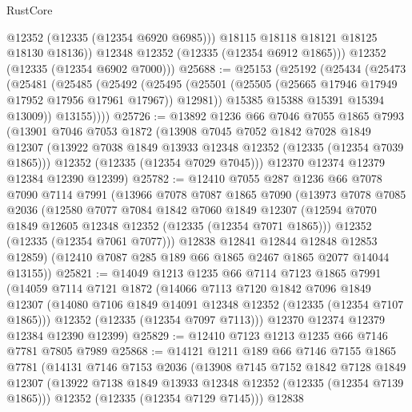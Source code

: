 \begin{lexlean}{RustCore}
\begin{coremodule}
              @12352
              (@12335 (@12354 @6920 @6985)))
            @18115
            @18118
            @18121
            @18125
            @18130
            @18136))
        @12348
        @12352
        (@12335 (@12354 @6912 @1865)))
      @12352
      (@12335 (@12354 @6902 @7000)))
@25688 := @25153
    (@25192
      (@25434
        (@25473
          (@25481
            (@25485
              (@25492
                (@25495 (@25501 (@25505 (@25665 @17946 @17949 @17952 @17956 @17961 @17967)) @12981))
                @15385
                @15388
                @15391
                @15394
                @13009))
            @13155))))
@25726 := @13892
    @1236
    @66
    @7046
    @7055
    @1865
    @7993
    (@13901
      @7046
      @7053
      @1872
      (@13908
        @7045
        @7052
        @1842
        @7028
        @1849
        @12307
        (@13922 @7038 @1849 @13933 @12348 @12352 (@12335 (@12354 @7039 @1865)))
        @12352
        (@12335 (@12354 @7029 @7045)))
      @12370
      @12374
      @12379
      @12384
      @12390
      @12399)
@25782 := @12410
    @7055
    @287
    @1236
    @66
    @7078
    @7090
    @7114
    @7991
    (@13966
      @7078
      @7087
      @1865
      @7090
      (@13973
        @7078
        @7085
        @2036
        (@12580
          @7077
          @7084
          @1842
          @7060
          @1849
          @12307
          (@12594 @7070 @1849 @12605 @12348 @12352 (@12335 (@12354 @7071 @1865)))
          @12352
          (@12335 (@12354 @7061 @7077)))
        @12838
        @12841
        @12844
        @12848
        @12853
        @12859)
      (@12410 @7087 @285 @189 @66 @1865 @2467 @1865 @2077 @14044 @13155))
@25821 := @14049
    @1213
    @1235
    @66
    @7114
    @7123
    @1865
    @7991
    (@14059
      @7114
      @7121
      @1872
      (@14066
        @7113
        @7120
        @1842
        @7096
        @1849
        @12307
        (@14080 @7106 @1849 @14091 @12348 @12352 (@12335 (@12354 @7107 @1865)))
        @12352
        (@12335 (@12354 @7097 @7113)))
      @12370
      @12374
      @12379
      @12384
      @12390
      @12399)
@25829 := @12410 @7123 @1213 @1235 @66 @7146 @7781 @7805 @7989
@25868 := @14121
    @1211
    @189
    @66
    @7146
    @7155
    @1865
    @7781
    (@14131
      @7146
      @7153
      @2036
      (@13908
        @7145
        @7152
        @1842
        @7128
        @1849
        @12307
        (@13922 @7138 @1849 @13933 @12348 @12352 (@12335 (@12354 @7139 @1865)))
        @12352
        (@12335 (@12354 @7129 @7145)))
      @12838

\end{coremodule}
\end{lexlean}
